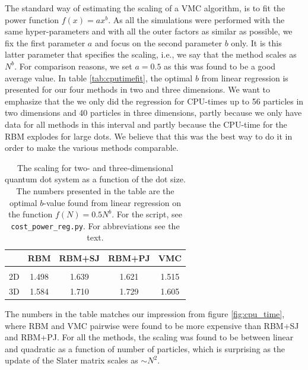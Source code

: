 The standard way of estimating the scaling of a VMC algorithm, is to fit the power function $f(x)=ax^b$. As all the simulations were performed with the same hyper-parameters and with all the outer factors as similar as possible, we fix the first parameter $a$ and focus on the second parameter $b$ only. It is this latter parameter that specifies the scaling, i.e., we say that the method scales as $N^b$. For comparison reasons, we set $a=0.5$ as this was found to be a good average value. In table \eqref{tab:cputimefit}, the optimal $b$ from linear regression is presented for our four methods in two and three dimensions. We want to emphasize that the we only did the regression for CPU-times up to 56 particles in two dimensions and 40 particles in three dimensions, partly because we only have data for all methods in this interval and partly because the CPU-time for the RBM explodes for large dots. We believe that this was the best way to do it in order to make the various methods comparable. 

\begin{table}
	\caption{The scaling for two- and three-dimensional quantum dot system as a function of the dot size. The numbers presented in the table are the optimal $b$-value found from linear regression on the function $f(N)=0.5N^b$. For the script, see \lstinline|cost_power_reg.py|. For abbreviations see the text.}
	\begin{tabularx}{\textwidth}{CCCCC} \hline\hline
		\label{tab:cputimefit}
		\makecell{\\ \phantom{=}} & RBM & RBM+SJ & RBM+PJ & VMC \\ \hline \\
		2D & 1.498 & 1.639 & 1.621 & 1.515 \\ 
		3D & 1.584 & 1.710 & 1.729 & 1.605 \\ \hline\hline
	\end{tabularx}
\end{table}

The numbers in the table matches our impression from figure \eqref{fig:cpu_time}, where RBM and VMC pairwise were found to be more expensive than RBM+SJ and RBM+PJ. For all the methods, the scaling was found to be between linear and quadratic as a function of number of particles, which is surprising as the update of the Slater matrix scales as $\sim N^2$. 

\newpage
